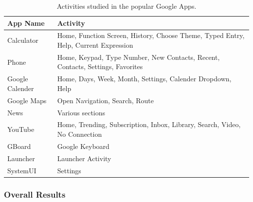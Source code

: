 \begin{table}[tp]
\begin{center}
	\centering
	\caption{Activities studied in the popular Google Apps.}
	\label{tab:experiments}
        \vspace{-0.1in}
	\small {
	\begin{tabular*}{\columnwidth}{ | p{} | p{} | }
		\hline
		App Name        	& Activity\\
		\hline
		Calculator		& Home, Function Screen, History, Choose Theme, Typed Entry, Help, Current Expression \\
		Phone			& Home, Keypad, Type Number, New Contacts, Recent, Contacts, Settings, Favorites \\
		Google Calender		& Home, Days, Week, Month, Settings, Calender Dropdown, Help \\
		Google Maps		& Open Navigation, Search, Route \\  
		News			& Various sections \\
		YouTube			& Home, Trending, Subscription, Inbox, Library, Search, Video, No Connection\\
		GBoard 			& Google Keyboard \\
		Launcher        	& Launcher Activity \\
		SystemUI        	& Settings \\
		\hline
	\end{tabular*}
	}
\end{center}
\vspace{-0.15in}
\end{table}
\fi

\subsubsection{Overall Results}


